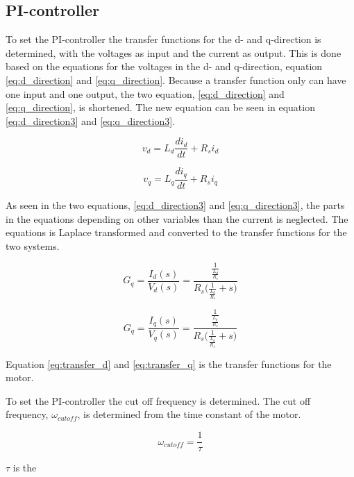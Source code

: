 \subsection{PI-controller}

To set the PI-controller the transfer functions for the d- and q-direction is determined, with the voltages as input and the current as output. This is done based on the equations for the voltages in the d- and q-direction, equation \ref{eq:d_direction} and \ref{eq:q_direction}.
Because a transfer function only can have one input and one output, the two equation, \ref{eq:d_direction} and \ref{eq:q_direction}, is shortened. The new equation can be seen in equation \ref{eq:d_direction3} and \ref{eq:q_direction3}.

\begin{equation}
    \label{eq:d_direction3}
    v_d = L_d \frac{d i_d}{dt} + R_s i_d
\end{equation}

\begin{equation}
    \label{eq:q_direction3}
    v_q = L_q \frac{d i_q}{dt} + R_s i_q
\end{equation}

As seen in the two equations, \ref{eq:d_direction3} and \ref{eq:q_direction3}, the parts in the equations depending on other variables than the current is neglected. 
The equations is Laplace transformed and converted to the transfer functions for the two systems.

\begin{equation}
    \label{eq:transfer_d}
    G_q = \frac{I_d(s)}{V_d(s)} = \frac{ \frac{1}{ \frac{L_d}{R_s} } }{ R_s \bigg(\frac{1}{ \frac{L_d}{R_s} } + s \bigg) }
\end{equation}

\begin{equation}
    \label{eq:transfer_q}
    G_q = \frac{I_q(s)}{V_q(s)} = \frac{ \frac{1}{ \frac{L_q}{R_s} } }{ R_s \bigg(\frac{1}{ \frac{L_q}{R_s} } + s \bigg) }
\end{equation}

Equation \ref{eq:transfer_d} and \ref{eq:transfer_q} is the transfer functions for the motor.

To set the PI-controller the cut off frequency is determined. The cut off frequency, $\omega_{cutoff}$, is determined from the time constant of the motor.

\begin{equation}
    \omega_{cutoff} = \frac{1}{\tau}
\end{equation}

$\tau$ is the 